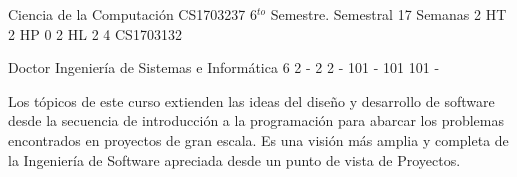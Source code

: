 \documentclass[a4paper,8pt]{article}
\begin{document}
\setNombreProfesor{}
\setGradoProfesorAbreviado{}
\sylabusHeader

\academicaTable
{Ciencia de la Computación} %
{CS1703237} %
{6$^{to}$ Semestre.} %
{Semestral} %
{17 Semanas} %
{2 HT} %
{2 HP} %
{0} %
{2 HL}  %
{2} %
{4} %
{CS1703132} %

\administrativaTable
{Doctor} %
{Ingeniería de Sistemas e Informática} %
{6} %
{2} %
{-} %
{2} %
{2} %
{-} %
{101} %
{-} %
{101} %
{101} %
{-} %


\begin{fundamentacion}
Los tópicos de este curso extienden las ideas del diseño y desarrollo de software desde la secuencia de introducción a la programación para
abarcar los problemas encontrados en proyectos de gran escala. Es una visión más amplia y completa de la Ingeniería
de Software apreciada desde un punto de vista de Proyectos.

\end{fundamentacion}

\begin{sumilla}
\item \SEToolsandEnvironments
\item \SESoftwareVerificationandValidation
\item \SESoftwareEvolution
\item \SESoftwareProjectManagement

\end{sumilla}

\begin{competenciasAsignatura}
\item {}
\item {}
\item {}
\item {}
\item {}
\item {}
\item {}
\item {}
\item {}

\end{competenciasAsignatura}
\end{document}
